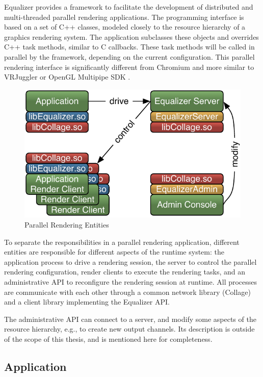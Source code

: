 Equalizer provides a framework to facilitate the development of distributed and
multi-threaded parallel rendering applications. The programming interface is
based on a set of C++ classes, modeled closely to the resource hierarchy of a
graphics rendering system. The application subclasses these objects and
overrides C++ task methods, similar to C callbacks. These task methods will be
called in parallel by the framework, depending on the current configuration.
This parallel rendering interface is significantly different from Chromium
\cite{HHNFAKK:02} and more similar to VRJuggler \cite{BJHMBC:01} or OpenGL
Multipipe SDK \cite{BRE:05}.

\begin{figure}
 \includegraphics[width=.618\textwidth]{images/processes}
 {\caption{\label{fProcessing}Parallel Rendering Entities}}
\end{figure}

To separate the responsibilities in a parallel rendering application, different
entities are responsible for different aspects of the runtime system: the
application process to drive a rendering session, the server to control the
parallel rendering configuration, render clients to execute the rendering
tasks, and an administrative API to reconfigure the rendering session at
runtime. All processes are communicate with each other through a common network library (Collage) and a client library implementing the Equalizer API.

The administrative API can connect to a server, and modify some aspects of the
resource hierarchy, e.g., to create new output channels. Its description is
outside of the scope of this thesis, and is mentioned here for
completeness.

\subsection{Application}

